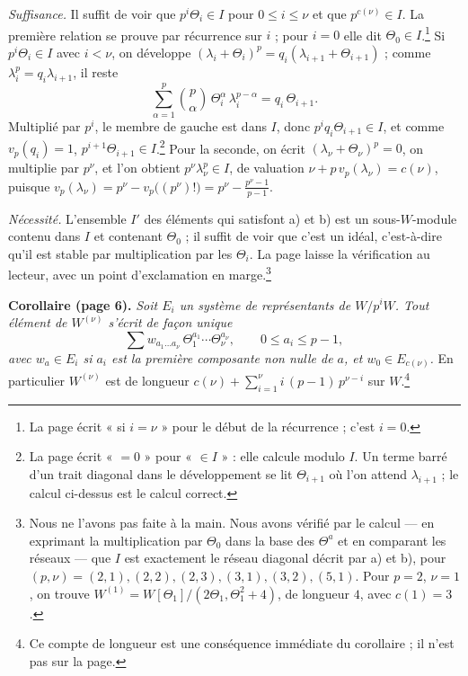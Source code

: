 \documentclass[11pt,a4paper]{article}
\begin{document}
\emph{Suffisance.} Il suffit de voir que $p^{i}\Theta_i \in I$ pour
$0 \leqslant i \leqslant \nu$ et que $p^{c(\nu)} \in I$. La première relation
se prouve par récurrence sur $i$ ; pour $i = 0$ elle dit
$\Theta_0 \in I$.\footnote{La page écrit « si $i = \nu$ » pour le début de
la récurrence ; c'est $i = 0$.} Si $p^{i}\Theta_i \in I$ avec $i < \nu$, on
développe $(\lambda_i + \Theta_i)^{p} = q_i(\lambda_{i+1} + \Theta_{i+1})$ ;
comme $\lambda_i^{p} = q_i \lambda_{i+1}$, il reste
\[
\sum_{\alpha=1}^{p} \binom{p}{\alpha}\, \Theta_i^{\alpha}\, \lambda_i^{p-\alpha}
= q_i\, \Theta_{i+1} .
\]
Multiplié par $p^{i}$, le membre de gauche est dans $I$, donc
$p^{i} q_i \Theta_{i+1} \in I$, et comme $v_p(q_i) = 1$, $p^{i+1}\Theta_{i+1}
\in I$.\footnote{La page écrit « $= 0$ » pour « $\in I$ » : elle calcule
modulo $I$. Un terme barré d'un trait diagonal dans le développement se lit
$\Theta_{i+1}$ où l'on attend $\lambda_{i+1}$ ; le calcul ci-dessus est le
calcul correct.} Pour la seconde, on écrit $(\lambda_\nu + \Theta_\nu)^{p} =
0$, on multiplie par $p^{\nu}$, et l'on obtient $p^{\nu}\lambda_\nu^{p} \in
I$, de valuation $\nu + p\, v_p(\lambda_\nu) = c(\nu)$, puisque
$v_p(\lambda_\nu) = p^{\nu} - v_p\bigl((p^{\nu})!\bigr) = p^{\nu} -
\frac{p^{\nu}-1}{p-1}$.

\emph{Nécessité.} L'ensemble $I'$ des éléments qui satisfont a) et b) est
un sous-$W$-module contenu dans $I$ et contenant $\Theta_0$ ; il suffit
de voir que c'est un idéal, c'est-à-dire qu'il est stable par multiplication
par les $\Theta_i$. La page laisse la vérification au lecteur, avec un point
d'exclamation en marge.\footnote{Nous ne l'avons pas faite à la main. Nous
avons vérifié par le calcul — en exprimant la multiplication par
$\Theta_0$ dans la base des $\Theta^{a}$ et en comparant les réseaux —
que $I$ est exactement le réseau diagonal décrit par a) et b), pour
$(p, \nu) = (2,1), (2,2), (2,3), (3,1), (3,2), (5,1)$. Pour $p = 2$, $\nu = 1$,
on trouve $W^{(1)} = W[\Theta_1]/(2\Theta_1, \Theta_1^{2} + 4)$, de longueur
$4$, avec $c(1) = 3$.}

\textbf{Corollaire (page 6).} \emph{Soit $E_i$ un système de représentants de
$W/p^{i}W$. Tout élément de $W^{(\nu)}$ s'écrit de façon unique}
\[
\sum w_{a_1 \ldots a_\nu}\, \Theta_1^{a_1}\cdots\Theta_\nu^{a_\nu},
\qquad 0 \leqslant a_i \leqslant p-1,
\]
\emph{avec $w_a \in E_i$ si $a_i$ est la première composante non nulle de
$a$, et $w_0 \in E_{c(\nu)}$.} En particulier $W^{(\nu)}$ est de longueur
$c(\nu) + \sum_{i=1}^{\nu} i\,(p-1)\,p^{\nu-i}$ sur $W$.\footnote{Ce compte
de longueur est une conséquence immédiate du corollaire ; il n'est pas sur la
page.}
\end{document}
